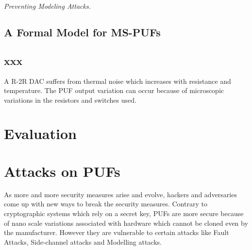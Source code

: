 {\flushleft \em Preventing Modeling Attacks.}


\subsection{A Formal Model for MS-PUFs}

\subsection{xxx}




A R-2R DAC suffers from thermal noise which increases with resistance and temperature. The PUF output variation can occur because of microscopic variations in the resistors and switches used.





\section{Evaluation}

\section{Attacks on PUFs}
As more and more security measures arise and evolve, hackers and adversaries come up with new ways to break the security measures. Contrary to cryptographic systems which rely on a secret key, PUFs are more secure because of nano scale variations associated with hardware which cannot be cloned even by the manufacturer. However they are vulnerable to certain attacks like Fault Attacks, Side-channel attacks and Modelling attacks. 
